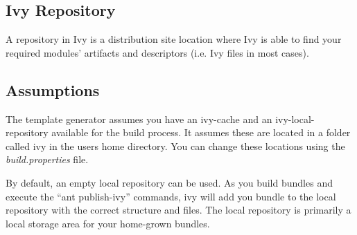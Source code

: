 \subsection{Ivy Repository}
A repository in Ivy is a distribution site location where Ivy is able to find your
required modules' artifacts and descriptors (i.e. Ivy files in most cases).

\subsection{Assumptions}
The template generator assumes you have an ivy-cache and an ivy-local-repository
available for the build process. It assumes these are located in a folder called
ivy in the users home directory. You can change these locations using the
\emph{build.properties} file.

By default, an empty local repository can be used. As you build bundles and execute
the ``ant publish-ivy'' commands, ivy will add you bundle to the local repository
with the correct structure and files. The local repository is primarily a local
storage area for your home-grown bundles.

\begin{figure}[H]
\end{figure}
